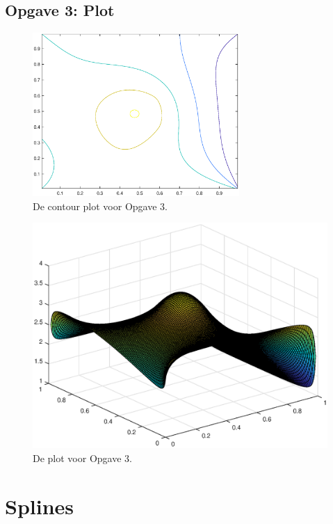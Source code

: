 \documentclass[a4paper]{article}
\newcommand{\opgave}[1]{\subsection{Opgave #1}}
\begin{document}
\opgave{3: Plot}\label{sec:oef3}
\newpage
\begin{figure}[H]
	\begin{center} 
		\includegraphics[width=0.7\textwidth]{Contour3.eps}
	\end{center}
	\caption{De contour plot voor Opgave 3.}
	\label{fig:Contour3}
\end{figure}

\begin{figure}[H]
	\begin{center} 
		\includegraphics[width=1\textwidth]{Plot3.eps}
	\end{center}
	\caption{De plot voor Opgave 3.}
	\label{fig:Plot3}
\end{figure}
\newpage

\section{Splines}\label{sec:splines}
\end{document}
